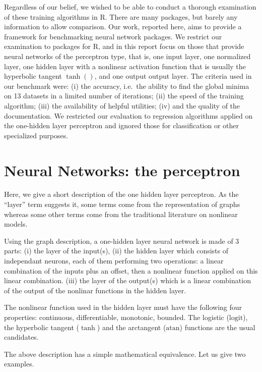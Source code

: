 Regardless of our belief, we wished to be able to conduct a thorough
examination of these training algorithms in R. There are many packages,
but barely any information to allow comparison. Our work, reported here,
aims to provide a framework for benchmarking neural network packages. We
restrict our examination to packages for R, and in this report focus on
those that provide neural networks of the perceptron type, that is, one
input layer, one normalized layer, one hidden layer with a nonlinear
activation function that is usually the hyperbolic tangent \(\tanh()\),
and one output output layer. The criteria used in our benchmark were:
(i) the accuracy, i.e.~the ability to find the global minima on 13
datasets in a limited number of iterations; (ii) the speed of the
training algorithm; (iii) the availability of helpful utilities; (iv)
and the quality of the documentation. We restricted our evaluation to
regression algorithms applied on the one-hidden layer perceptron and
ignored those for classification or other specialized purposes.

\hypertarget{neural-networks-the-perceptron}{%
\section{Neural Networks: the
perceptron}\label{neural-networks-the-perceptron}}

Here, we give a short description of the one hidden layer perceptron. As
the ``layer'' term suggests it, some terms come from the representation
of graphs whereas some other terms come from the traditional literature
on nonlinear models.

Using the graph description, a one-hidden layer neural network is made
of 3 parts: (i) the layer of the input(s), (ii) the hidden layer which
consists of independant neurons, each of them performing two operations:
a linear combination of the inputs plus an offset, then a nonlinear
function applied on this linear combination. (iii) the layer of the
output(s) which is a linear combination of the output of the nonlinar
functions in the hidden layer.

The nonlinear function used in the hidden layer must have the following
four properties: continuous, differentiable, monotonic, bounded. The
logistic (\(\text{logit}\)), the hyperbolic tangent (\(\tanh\)) and the
arctangent (\(\text{atan}\)) functions are the usual candidates.

The above description has a simple mathematical equivalence. Let us give
two examples.

